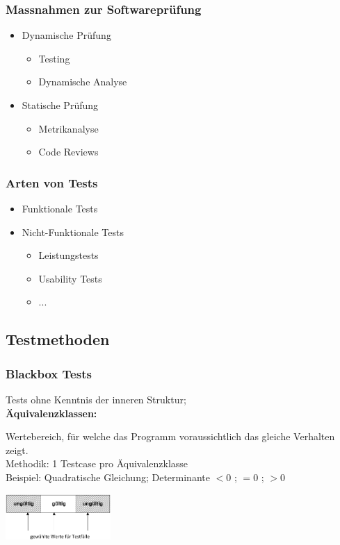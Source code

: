 \begin{multicols}{2}
	\subsubsection{Massnahmen zur Softwareprüfung}
	\begin{itemize}
		\item Dynamische Prüfung
		\begin{itemize}
			\item Testing
			\item Dynamische Analyse
		\end{itemize}
		\item Statische Prüfung
		\begin{itemize}
			\item Metrikanalyse
			\item Code Reviews
		\end{itemize}
	\end{itemize}
	
	\subsubsection{Arten von Tests}
	\begin{itemize}
		\item Funktionale Tests
		\item Nicht-Funktionale Tests
		\begin{itemize}
			\item Leistungstests
			\item Usability Tests
			\item ...
		\end{itemize}
	\end{itemize}
\end{multicols}

\pagebreak
\subsection{Testmethoden}
\subsubsection{Blackbox Tests}
	Tests ohne Kenntnis der inneren Struktur;\\

\textbf{Äquivalenzklassen:} \\
\begin{minipage}{15cm}
Wertebereich, für welche das Programm voraussichtlich das gleiche Verhalten zeigt. \\
Methodik: 1 Testcase pro Äquivalenzklasse \\
Beispiel: Quadratische Gleichung; Determinante $<0$ ; $=0$ ; $>0$ \\
\end{minipage}
\begin{minipage}{4cm}
	\includegraphics[width=4cm]{images/aequivalenzklasse.png}
\end{minipage}

